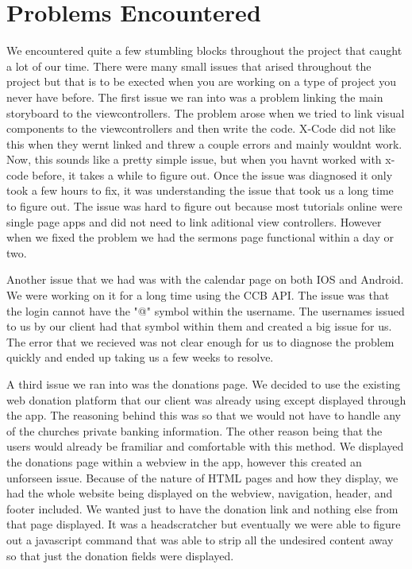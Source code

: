 \documentclass[letterpaper,10pt,draftclsnofoot,onecolumn,titlepage]{IEEEtran}
\begin{document}
\section{Problems Encountered}
		We encountered quite a few stumbling blocks throughout the project that caught a lot of our time. 
		There were many small issues that arised throughout the project but that is to be exected when you are working on a type of project you never have before.
		The first issue we ran into was a problem linking the main storyboard to the viewcontrollers. 
		The problem arose when we tried to link visual components to the viewcontrollers and then write the code.
		X-Code did not like this when they wernt linked and threw a couple errors and mainly wouldnt work.
		Now, this sounds like a pretty simple issue, but when you havnt worked with x-code before, it takes a while to figure out.
		Once the issue was diagnosed it only took a few hours to fix, it was understanding the issue that took us a long time to figure out.
		The issue was hard to figure out because most tutorials online were single page apps and did not need to link aditional view controllers.
		However when we fixed the problem we had the sermons page functional within a day or two.

		Another issue that we had was with the calendar page on both IOS and Android.
		We were working on it for a long time using the CCB API.
		The issue was that the login cannot have the "@" symbol within the username.
		The usernames issued to us by our client had that symbol within them and created a big issue for us.
		The error that we recieved was not clear enough for us to diagnose the problem quickly and ended up taking us a few weeks to resolve.

		A third issue we ran into was the donations page.
		We decided to use the existing web donation platform that our client was already using except displayed through the app.
		The reasoning behind this was so that we would not have to handle any of the churches private banking information.
		The other reason being that the users would already be framiliar and comfortable with this method.
		We displayed the donations page within a webview in the app, however this created an unforseen issue. 
		Because of the nature of HTML pages and how they display, we had the whole website being displayed on the webview, navigation, header, and footer included.
		We wanted just to have the donation link and nothing else from that page displayed.
		It was a headscratcher but eventually we were able to figure out a javascript command that was able to strip all the undesired content away so that just the donation fields were displayed.
\end{document}
